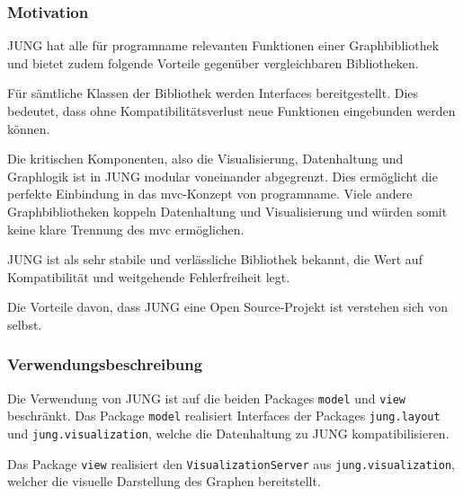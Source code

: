 \subsubsection{Motivation}
JUNG hat alle für \gls{programname} relevanten Funktionen einer Graphbibliothek und bietet zudem folgende Vorteile gegenüber vergleichbaren Bibliotheken. 

Für sämtliche Klassen der Bibliothek werden Interfaces bereitgestellt. Dies bedeutet, dass ohne Kompatibilitätsverlust neue Funktionen eingebunden werden können. 

Die kritischen Komponenten, also die Visualisierung, Datenhaltung und Graphlogik ist in JUNG modular voneinander abgegrenzt. Dies ermöglicht die perfekte Einbindung in das \gls{mvc}-Konzept von \gls{programname}. Viele andere Graphbibliotheken koppeln Datenhaltung und Visualisierung und würden somit keine klare Trennung des \gls{mvc} ermöglichen. 

JUNG ist als sehr stabile und verlässliche Bibliothek bekannt, die Wert auf Kompatibilität und weitgehende Fehlerfreiheit legt. 

Die Vorteile davon, dass JUNG eine Open Source-Projekt ist verstehen sich von selbst. 

\subsubsection{Verwendungsbeschreibung}

Die Verwendung von JUNG ist auf die beiden Packages \texttt{model} und  \texttt{view} beschränkt. Das Package \texttt{model} realisiert Interfaces der Packages \texttt{jung.layout} und \texttt{jung.visualization}, welche die Datenhaltung zu JUNG kompatibilisieren. 

Das Package \texttt{view} realisiert den \texttt{VisualizationServer} aus \texttt{jung.visualization}, welcher die visuelle Darstellung des Graphen bereitstellt. 
